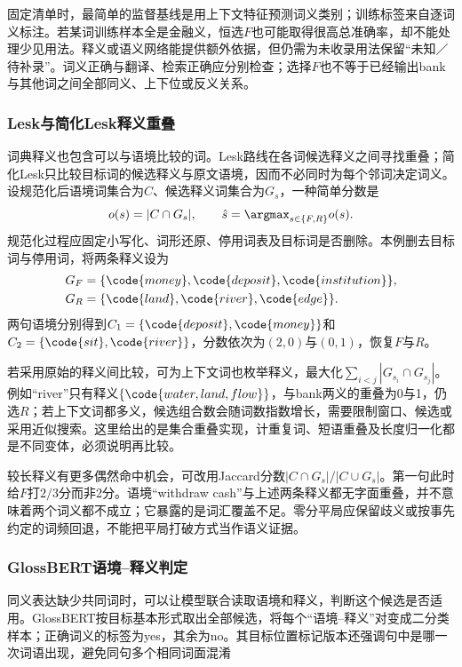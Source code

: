 固定清单时，最简单的监督基线是用上下文特征预测词义类别；训练标签来自逐词义标注。若某词训练样本全是金融义，恒选$F$也可能取得很高总准确率，却不能处理少见用法。释义或语义网络能提供额外依据，但仍需为未收录用法保留“未知／待补录”。词义正确与翻译、检索正确应分别检查；选择$F$也不等于已经输出bank与其他词之间全部同义、上下位或反义关系。

\subsubsection{Lesk与简化Lesk释义重叠}
\label{sec:nlp-analysis-lesk}

词典释义也包含可以与语境比较的词。Lesk路线在各词候选释义之间寻找重叠；简化Lesk只比较目标词的候选释义与原文语境，因而不必同时为每个邻词决定词义。设规范化后语境词集合为$C$、候选释义词集合为$G_s$，一种简单分数是
\[
  o(s)=|C\cap G_s|,\qquad \hat s=\argmax_{s\in\{F,R\}}o(s).
\]
规范化过程应固定小写化、词形还原、停用词表及目标词是否删除。本例删去目标词与停用词，将两条释义设为
\[
\begin{aligned}
 G_F&=\{\code{money},\code{deposit},\code{institution}\},\\
 G_R&=\{\code{land},\code{river},\code{edge}\}.
\end{aligned}
\]
两句语境分别得到$C_1=\{\code{deposit},\code{money}\}$和$C_2=\{\code{sit},\code{river}\}$，分数依次为$(2,0)$与$(0,1)$，恢复$F$与$R$。

若采用原始的释义间比较，可为上下文词也枚举释义，最大化$\sum_{i<j}|G_{s_i}\cap G_{s_j}|$。例如“river”只有释义$\{\code{water,land,flow}\}$，与bank两义的重叠为0与1，仍选$R$；若上下文词都多义，候选组合数会随词数指数增长，需要限制窗口、候选或采用近似搜索。这里给出的是集合重叠实现，计重复词、短语重叠及长度归一化都是不同变体，必须说明再比较。

较长释义有更多偶然命中机会，可改用Jaccard分数$|C\cap G_s|/|C\cup G_s|$。第一句此时给$F$打$2/3$分而非2分。语境“withdraw cash”与上述两条释义都无字面重叠，并不意味着两个词义都不成立；它暴露的是词汇覆盖不足。零分平局应保留歧义或按事先约定的词频回退，不能把平局打破方式当作语义证据。

\subsubsection{GlossBERT语境--释义判定}
\label{sec:nlp-analysis-glossbert}

同义表达缺少共同词时，可以让模型联合读取语境和释义，判断这个候选是否适用。GlossBERT按目标基本形式取出全部候选，将每个“语境--释义”对变成二分类样本；正确词义的标签为yes，其余为no。其目标位置标记版本还强调句中是哪一次词语出现，避免同句多个相同词面混淆

